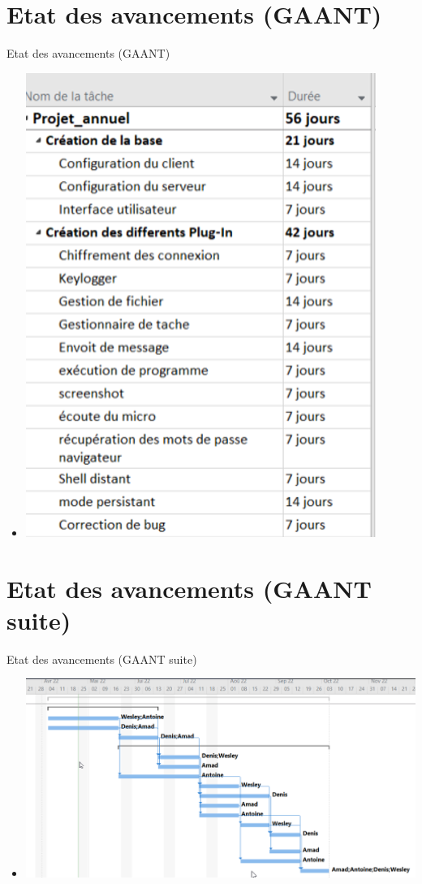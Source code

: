 \documentclass{beamer}
\begin{document}
\section{Etat des avancements (GAANT)}
  \begin{frame}{Etat des avancements  (GAANT)}
  \begin{itemize}
	\item 
	\includegraphics[scale=.5]{gaant1.png}
  \end{itemize}
  \end{frame}

\section{Etat des avancements (GAANT suite)}
  \begin{frame}{Etat des avancements  (GAANT suite)}
  \begin{itemize}
	\item 
	\includegraphics[scale=.4]{gaant2.png}
  \end{itemize}
  \end{frame}
\end{document}
